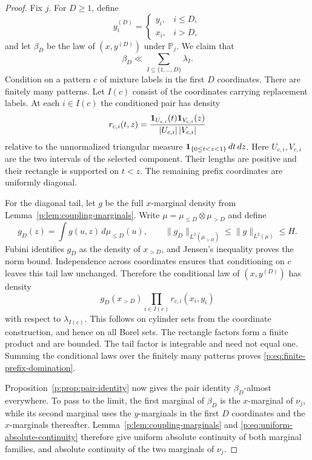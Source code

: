 \begin{proof}
Fix $j$.  For $D\ge1$, define
\[
 y_i^{(D)}=
 \begin{cases}
  y_i,&i\le D,\\
  x_i,&i>D,
 \end{cases}
\]
and let $\beta_D$ be the law of $(x,y^{(D)})$ under $\mathbb P_j$.
We claim that
\begin{equation}\label{p:eq:finite-prefix-domination}
 \beta_D\ll\sum_{I\subseteq\{1,\ldots,D\}}\lambda_I.
\end{equation}
Condition on a pattern $c$ of mixture labels in the first $D$
coordinates.  There are finitely many patterns.  Let $I(c)$ consist
of the coordinates carrying replacement labels.  At each $i\in I(c)$
the conditioned pair has density
\[
 r_{c,i}(t,z)=
 \frac{\mathbf 1_{U_{c,i}}(t)\mathbf 1_{V_{c,i}}(z)}
 {|U_{c,i}|\,|V_{c,i}|}
\]
relative to the unnormalized triangular measure
$\mathbf 1_{\{0\le t<z<1\}}\,dt\,dz$.  Here $U_{c,i},V_{c,i}$ are the
two intervals of the selected component.  Their lengths are positive
and their rectangle is supported on $t<z$.  The remaining prefix
coordinates are uniformly diagonal.

For the diagonal tail, let $g$ be the full $x$-marginal density from
Lemma~\ref{p:lem:coupling-marginals}.  Write
$\mu=\mu_{\le D}\otimes\mu_{>D}$ and define
\begin{equation}\label{p:eq:tail-density}
 g_D(z)=\int g(u,z)\,d\mu_{\le D}(u),
 \qquad
 \|g_D\|_{L^2(\mu_{>D})}\le\|g\|_{L^2(\mu)}\le H.
\end{equation}
Fubini identifies $g_D$ as the density of $x_{>D}$, and Jensen's
inequality proves the norm bound.  Independence across coordinates
ensures that conditioning on $c$ leaves this tail law unchanged.
Therefore the conditional law of $(x,y^{(D)})$ has density
\begin{equation}\label{p:eq:conditioned-prefix-density}
 g_D(x_{>D})\prod_{i\in I(c)}r_{c,i}(x_i,y_i)
\end{equation}
with respect to $\lambda_{I(c)}$.  This follows on cylinder sets
from the coordinate construction, and hence on all Borel sets.
The rectangle factors form a finite product and are bounded.  The
tail factor is integrable and need not equal one.  Summing the
conditional laws over the finitely many patterns proves
\eqref{p:eq:finite-prefix-domination}.

Proposition~\ref{p:prop:pair-identity} now gives the pair identity
$\beta_D$-almost everywhere.  To pass to the limit, the first marginal
of $\beta_D$ is the $x$-marginal of $\nu_j$, while its second marginal
uses the $y$-marginals in the first $D$ coordinates and the
$x$-marginals thereafter.  Lemma~\ref{p:lem:coupling-marginals} and
\eqref{p:eq:uniform-absolute-continuity} therefore give uniform
absolute continuity of both marginal families, and absolute continuity
of the two marginals of $\nu_j$.


\end{proof}
